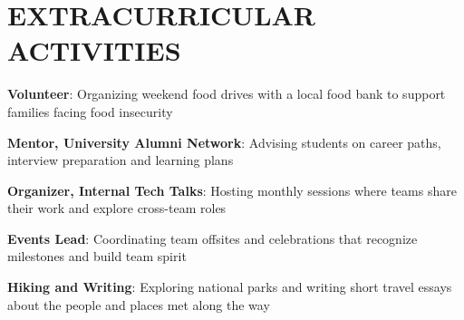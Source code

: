     \section{EXTRACURRICULAR ACTIVITIES}
    \begin{onecolentry}
        \textbf{Volunteer}: Organizing weekend food drives with a local food bank to support families facing food insecurity
    \end{onecolentry}
    \vspace{0.05 cm}
    \begin{onecolentry}
        \textbf{Mentor, University Alumni Network}: Advising students on career paths, interview preparation and learning plans
    \end{onecolentry}
    \vspace{0.05 cm}
    \begin{onecolentry}
        \textbf{Organizer, Internal Tech Talks}: Hosting monthly sessions where teams share their work and explore cross-team roles
    \end{onecolentry}
    \vspace{0.05 cm}
    \begin{onecolentry}
        \textbf{Events Lead}: Coordinating team offsites and celebrations that recognize milestones and build team spirit
    \end{onecolentry}
    \vspace{0.05 cm}
    \begin{onecolentry}
        \textbf{Hiking and Writing}: Exploring national parks and writing short travel essays about the people and places met along the way
    \end{onecolentry}


